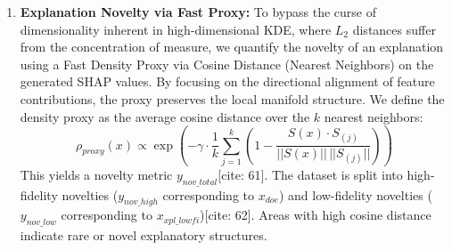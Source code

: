 \documentclass[sn-mathphys]{sn-jnl}
\theoremstyle{thmstyleone}%
\theoremstyle{thmstyletwo}%
\theoremstyle{thmstylethree}%
\begin{document}
\begin{enumerate}
    \item \textbf{Explanation Novelty via Fast Proxy:} To bypass the curse of dimensionality inherent in high-dimensional KDE, where $L_2$ distances suffer from the concentration of measure, we quantify the novelty of an explanation using a Fast Density Proxy via Cosine Distance (Nearest Neighbors) on the generated SHAP values. By focusing on the directional alignment of feature contributions, the proxy preserves the local manifold structure. We define the density proxy as the average cosine distance over the $k$ nearest neighbors:
    \begin{equation}
        \rho_{proxy}(x) \propto \exp\left( -\gamma \cdot \frac{1}{k} \sum_{j=1}^k \left(1 - \frac{S(x) \cdot S_{(j)}}{||S(x)|| \, ||S_{(j)}||}\right) \right)
    \end{equation}
    This yields a novelty metric $y_{nov\_total}$[cite: 61]. The dataset is split into high-fidelity novelties ($y_{nov\_high}$ corresponding to $x_{doe}$) and low-fidelity novelties ($y_{nov\_low}$ corresponding to $x_{xpl\_lowfi}$)[cite: 62]. Areas with high cosine distance indicate rare or novel explanatory structures.
    

\end{enumerate}
\end{document}
